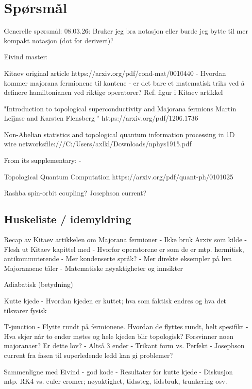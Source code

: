 
\chapter{Spørsmål}
Generelle spørsmål:
08.03.26: Bruker jeg bra notasjon eller burde jeg bytte til mer kompakt notasjon (dot for derivert)?

Eivind master:

Kitaev original article https://arxiv.org/pdf/cond-mat/0010440
- Hvordan kommer majorana fermionene til kantene - er det bare et matematisk triks ved å definere hamiltonianen ved riktige operatorer? Ref. figur i Kitaev artikkel 

"Introduction to topological superconductivity and
Majorana fermions
Martin Leijnse and Karsten Flensberg " https://arxiv.org/pdf/1206.1736

Non-Abelian statistics and topological quantum
information processing in 1D wire networksfile:///C:/Users/axlkl/Downloads/nphys1915.pdf

From its supplementary:
- 

Topological Quantum Computation
https://arxiv.org/pdf/quant-ph/0101025

Rashba spin-orbit coupling? 
Josephson current?

\section{Huskeliste / idemyldring}
Recap av Kitaev artikkelen om Majorana fermioner
    - Ikke bruk Arxiv som kilde
    - Flesh ut Kitaev kapittel med 
        - Hvorfor operatorene er som de er mtp. hermitisk, antikommuterende
        - Mer kondenserte språk? - Mer direkte eksempler på hva Majoranaene tåler 
        - Matematiske nøyaktigheter og innsikter

Adiabatisk (betydning)

Kutte kjede
    - Hvordan kjeden er kuttet; hva som faktisk endres og hva det tilsvarer fysisk

T-junction
    - Flytte rundt på fermionene. Hvordan de flyttes rundt, helt spesifikt
    - Hva skjer når to ender møtes og hele kjeden blir topologisk? Forsvinner noen majoranaer? Er dette lov?
        - Altså 3 ender
    - Trikant form vs. Perfekt
    - Josephson current fra fasen til superledende ledd kan gi problemer?

Sammenligne med Eivind - god kode
    - Resultater for kutte kjede
        - Diskusjon mtp. RK4 vs. euler cromer; nøyaktighet, tidssteg, tidsbruk, trunkering osv.

